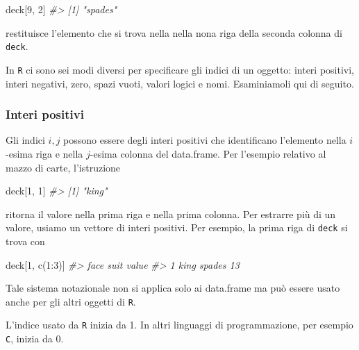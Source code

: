 \documentclass[
  11pt,
]{krantz}
\makeatletter
\newenvironment{Shaded}{\begin{snugshade}}{\end{snugshade}}
\newcommand{\CommentTok}[1]{\textcolor[rgb]{0.37,0.37,0.37}{\textit{#1}}}
\newcommand{\DecValTok}[1]{\textcolor[rgb]{0.06,0.06,0.06}{#1}}
\newcommand{\FunctionTok}[1]{\textcolor[rgb]{0,0,0}{#1}}
\newcommand{\NormalTok}[1]{#1}
\newcommand{\SpecialCharTok}[1]{\textcolor[rgb]{0,0,0}{#1}}
\newenvironment{kframe}{%
\medskip{}
\setlength{\fboxsep}{.8em}
 \def\at@end@of@kframe{}%
 \ifinner\ifhmode%
  \def\at@end@of@kframe{\end{minipage}}%
  \begin{minipage}{\columnwidth}%
 \fi\fi%
 \def\FrameCommand##1{\hskip\@totalleftmargin \hskip-\fboxsep
 \colorbox{shadecolor}{##1}\hskip-\fboxsep
     \hskip-\linewidth \hskip-\@totalleftmargin \hskip\columnwidth}%
 \MakeFramed {\advance\hsize-\width
   \@totalleftmargin\z@ \linewidth\hsize
   \@setminipage}}%
 {\par\unskip\endMakeFramed%
 \at@end@of@kframe}
\renewenvironment{Shaded}{\begin{kframe}}{\end{kframe}}
\theoremstyle{definition}
\theoremstyle{definition}
\theoremstyle{definition}
\theoremstyle{definition}
\theoremstyle{remark}
\makeatother
\begin{document}
\begin{Shaded}
\begin{Highlighting}[]
\NormalTok{deck[}\DecValTok{9}\NormalTok{, }\DecValTok{2}\NormalTok{]}
\CommentTok{\#\textgreater{} [1] "spades"}
\end{Highlighting}
\end{Shaded}

restituisce l'elemento che si trova nella nella nona riga della seconda colonna di \texttt{deck}.

In \texttt{R} ci sono sei modi diversi per specificare gli indici di un oggetto: interi positivi, interi negativi, zero, spazi vuoti, valori logici e nomi. Esaminiamoli qui di seguito.

\hypertarget{interi-positivi}{%
\subsubsection{Interi positivi}\label{interi-positivi}}

Gli indici \(i, j\) possono essere degli interi positivi che identificano l'elemento nella \(i\)-esima riga e nella \(j\)-esima colonna del data.frame. Per l'esempio relativo al mazzo di carte, l'istruzione

\begin{Shaded}
\begin{Highlighting}[]
\NormalTok{deck[}\DecValTok{1}\NormalTok{, }\DecValTok{1}\NormalTok{]}
\CommentTok{\#\textgreater{} [1] "king"}
\end{Highlighting}
\end{Shaded}

ritorna il valore nella prima riga e nella prima colonna. Per estrarre più di un valore, usiamo un vettore di interi positivi. Per esempio, la prima riga di \texttt{deck} si trova con

\begin{Shaded}
\begin{Highlighting}[]
\NormalTok{deck[}\DecValTok{1}\NormalTok{, }\FunctionTok{c}\NormalTok{(}\DecValTok{1}\SpecialCharTok{:}\DecValTok{3}\NormalTok{)]}
\CommentTok{\#\textgreater{}   face   suit value}
\CommentTok{\#\textgreater{} 1 king spades    13}
\end{Highlighting}
\end{Shaded}

Tale sistema notazionale non si applica solo ai data.frame ma può essere usato anche per gli altri oggetti di \texttt{R}.

L'indice usato da \texttt{R} inizia da 1. In altri linguaggi di programmazione, per esempio \texttt{C}, inizia da 0.
\end{document}
